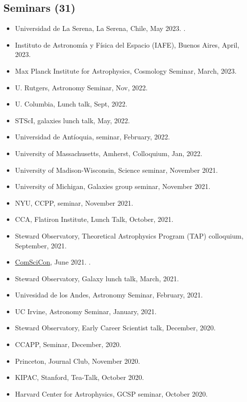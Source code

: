 \documentclass[UTF8]{article}
\begin{document}
\subsection*{Seminars (31)}
\begin{itemize}
  \setlength\itemsep{0.0em}
  \renewcommand\labelitemi{$\cdot$}
\item Universidad de La Serena, La Serena, Chile, May 2023. \dag. 
\item Instituto de Astronom\'ia y F\'isica del Espacio (IAFE), Buenos Aires, April, 2023.
\item Max Planck Institute for Astrophysics, Cosmology Seminar, March, 2023.
\item U. Rutgers, Astronomy Seminar, Nov, 2022. \dag
\item U. Columbia, Lunch talk, Sept, 2022. \dag
\item STScI, galaxies lunch talk, May, 2022. \dag
\item Universidad de Ant\'ioquia, seminar, February, 2022. \dag 
\item University of Massachusetts, Amherst, Colloquium, Jan, 2022. \dag
\item University of Madison-Wisconsin, Science seminar, November 2021.\dag
\item University of Michigan, Galaxies group seminar, November 2021.\dag
\item NYU, CCPP, seminar, November 2021.\dag 
\item CCA, Flatiron Institute, Lunch Talk, October, 2021.
\item Steward Observatory, Theoretical Astrophysics Program (TAP) colloquium, September, 2021.\dag
\item \href{https://comscicon.com/comscicon-en-espa%C3%B1ol-2021}{ComSciCon},
    June 2021. \dag. 
\item Steward Observatory, Galaxy lunch talk, March, 2021.
\item Univesidad de los Andes, Astronomy Seminar, February, 2021. 
\item UC Irvine, Astronomy Seminar, January, 2021. \dag
\item Steward Observatory, Early Career Scientist talk, December, 2020. \dag
\item CCAPP, Seminar, December, 2020. \dag
\item Princeton, Journal Club, November 2020. \dag
\item KIPAC, Stanford, Tea-Talk, October 2020.
\item Harvard Center for Astrophysics, GCSP seminar, October 2020.

\end{itemize}
\end{document}
